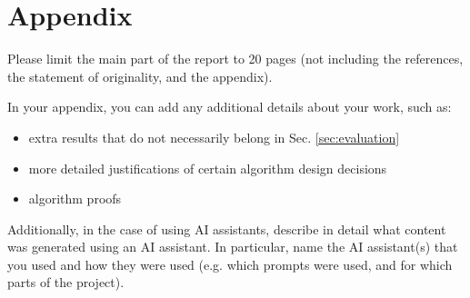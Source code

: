 \documentclass[../report.tex]{subfiles}
\begin{document}
    \section*{Appendix}
    \label{sec:appendix}

    Please limit the main part of the report to 20 pages (not including the references, the statement of originality, and the appendix).

    In your appendix, you can add any additional details about your work, such as:
    \begin{itemize}
        \item extra results that do not necessarily belong in Sec. \ref{sec:evaluation}
        \item more detailed justifications of certain algorithm design decisions
        \item algorithm proofs
    \end{itemize}

    Additionally, in the case of using AI assistants, describe in detail what content was generated using an AI assistant.
    In particular, name the AI assistant(s) that you used and how they were used (e.g. which prompts were used, and for which parts of the project).
\end{document}
